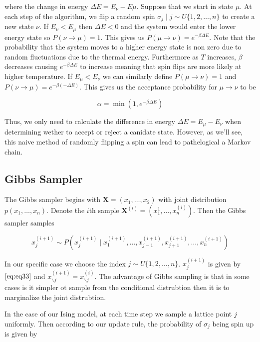 \documentclass{article}
\begin{document}
where the change in energy $\Delta E = E_{\nu} - E{\mu}$. Suppose that we start in state $\mu$. At each step of the algorithm, we flip a random spin $\sigma_j \mid j \sim U\{1,2,\ldots,n\}$ to create a new state $\nu$.
If $E_{\nu} < E_{\mu}$ then $\Delta E < 0$ and the system would enter the lower energy state so $P(\nu \rightarrow \mu) = 1$. This gives us
$P(\mu \rightarrow \nu) = e^{-\beta \Delta E}$. Note that the probability that the system moves to a higher energy state 
is non zero due to random fluctuations due to the thermal energy. Furthermore as $T$ increases, $\beta$ decreases causing $e^{-\beta \Delta E}$
to increase meaning that spin flips are more likely at higher temperature. If $E_{\mu} < E_{\nu}$ we can similarly define $P(\mu \rightarrow \nu) = 1$
and $P(\nu \rightarrow \mu) = e^{-\beta(-\Delta E)}$. This gives us the acceptance probability for $\mu \rightarrow \nu$ to be

\begin{equation}
    \alpha = \min(1, e^{-\beta \Delta E})
\end{equation}

Thus, we only need to calculate the difference in energy $\Delta E = E_{\mu} - E_{\nu}$ when determining wether to accept or reject a canidate state.
However, as we'll see, this naive method of randomly flipping a spin can lead to pathelogical a Markov chain.

\subsection{Gibbs Sampler}
The Gibbs sampler begins with $\mathbf{X} = (x_1, \ldots, x_2)$ with joint distribution $p(x_1, \ldots, x_n)$. Denote the $i$th sample
$\mathbf{X}^{(i)} = (x_1^{1}, \ldots, x_n^{(i)})$. Then the Gibbs sampler samples

\begin{equation} \label{eq:eq33}
    x_j^{(i+1)} \sim P(x_j^{(i+1)} \mid x_1^{(i+1)}, \ldots, x_{j-1}^{(i+1)}, x_{j+1}^{(i+1)}, \ldots, x_{n}^{(i+1)})
\end{equation}

In our specific case we choose the index $j \sim U\{1,2,\ldots, n\}$. $x_j^{(i+1)}$ is given by $\ref{eq:eq33}$ and 
$x_{\backslash j}^{(i+1)} = x_{\backslash j}^{(i)}$. The advantage of Gibbs sampling is that in some cases is it simpler ot sample from the conditional
distrubtion then it is to marginalize the joint distrubtion.

In the case of our Ising model, at each time step we sample a lattice point $j$ uniformly. Then according to our update rule, 
the probability of $\sigma_j$ being spin up is given by 
\end{document}
